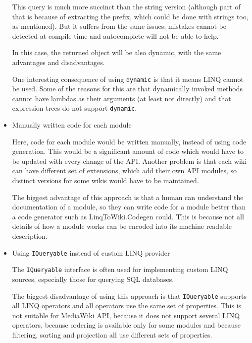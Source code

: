 \begin{itemize}
This query is much more succinct than the string version
(although part of that is because of extracting the prefix,
which could be done with strings too, as mentioned).
But it suffers from the same issues: mistakes cannot be detected at compile time
and autocomplete will not be able to help.

In this case, the returned object will be also dynamic,
with the same advantages and disadvantages.

One interesting consequence of using \lstinline{dynamic} is that it means LINQ cannot be used.
Some of the reasons for this are that dynamically invoked methods cannot have lambdas as their arguments
(at least not directly) and that expression trees do not support \lstinline{dynamic}.

\item Manually written code for each module

Here, code for each module would be written manually, instead of using code generation.
This would be a significant amount of code which would have to be updated with every change of the API.
Another problem is that each wiki can have different set of extensions, which add their own API modules,
so distinct versions for some wikis would have to be maintained.

The biggest advantage of this approach is that a human can understand the documentation of a module,
so they can write code for a module better than a code generator such as LinqToWiki.Codegen could.
This is because not all details of how a module works can be encoded into its machine readable description.

\item Using \lstinline{IQueryable} instead of custom LINQ provider

The \lstinline{IQueryable} interface is often used for implementing custom \ac{LINQ} sources,
especially those for querying \ac{SQL} databases.

The biggest disadvantage of using this approach is that \lstinline{IQueryable}
supports all LINQ operators and all operators use the same set of properties.
This is not suitable for MediaWiki \ac{API},
because it does not support several LINQ operators,
because ordering is available only for some modules
and because filtering, sorting and projection all use different sets of properties.

\end{itemize}